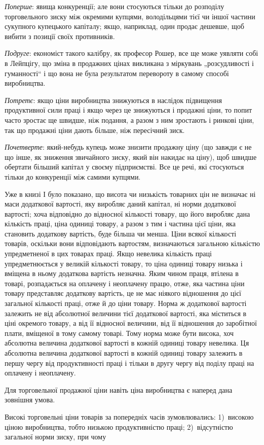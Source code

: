 \parcont{}  %
\emph{Поперше}: явища конкуренції; але вони стосуються тільки до
розподілу торговельного зиску між окремими купцями, володільцями
тієї чи іншої частини сукупного купецького капіталу; якщо,
наприклад, один продає дешевше, щоб вибити з позиції своїх
противників.

\emph{Подруге}: економіст такого калібру, як професор Рошер, все
ще може уявляти собі в Лейпцігу, що зміна в продажних цінах
викликана з міркувань „розсудливості і гуманності“ і що вона
не була результатом перевороту в самому способі виробництва.

\emph{Потретє}: якщо ціни виробництва знижуються в наслідок
підвищення продуктивної сили праці і якщо через це знижуються
і продажні ціни, то попит часто зростає ще швидше, ніж
подання, а разом з ним зростають і ринкові ціни, так що продажні
ціни дають більше, ніж пересічний зиск.

\emph{Почетверте}: який-небудь купець може знизити продажну
ціну (що завжди є не що інше, як зниження звичайного зиску,
який він накидає на ціну), щоб швидше обертати більший
капітал у своєму підприємстві. Все це речі, які стосуються
тільки до конкуренції між самими купцями.

Уже в книзі І було показано, що висота чи низькість товарних
цін не визначає ні маси додаткової вартості, яку
виробляє даний капітал, ні норми додаткової вартості; хоча
відповідно до відносної кількості товару, що його виробляє
дана кількість праці, ціна одиниці товару, а разом з тим
і частина цієї ціни, яка становить додаткову вартість, буде більша
чи менша. Ціни всякої кількості товарів, оскільки вони відповідають
вартостям, визначаються загальною кількістю упредметненої
в цих товарах праці. Якщо невелика кількість праці
упредметнюється у великій кількості товару, то ціна одиниці
товару низька і вміщена в ньому додаткова вартість незначна.
Яким чином праця, втілена в товарі, розпадається на оплачену
і неоплачену працю, отже, яка частина ціни товару представляє
додаткову вартість, це не має ніякого відношення до цієї загальної
кількості праці, отже й до ціни товару. Норма ж додаткової
вартості залежить не від абсолютної величини тієї
додаткової вартості, яка міститься в ціні окремого товару,
а від її відносної величини, від її відношення до заробітної плати,
вміщеної в тому самому товарі. Тому норма може бути висока,
хоч абсолютна величина додаткової вартості в кожній одиниці
товару невелика. Ця абсолютна величина додаткової вартості
в кожній одиниці товару залежить в першу чергу від продуктивності
праці і тільки в другу чергу від поділу праці на оплачену
і неоплачену.

Для торговельної продажної ціни навіть ціна виробництва є
наперед дана зовнішня умова.

Високі торговельні ціни товарів за попередніх часів зумовлювались:
1)~високою ціною виробництва, тобто низькою продуктивністю
праці; 2)~відсутністю загальної норми зиску, при чому
\parbreak{}  %
